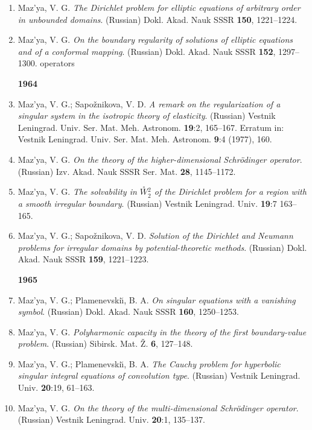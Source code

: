\documentclass{article}
\begin{document}
\begin{enumerate}
{\bf 1963}
\item Maz'ya, V. G. {\it The Dirichlet problem for elliptic equations
of
arbitrary order in unbounded domains}.
(Russian) Dokl. Akad. Nauk SSSR {\bf 150}, 1221--1224.
\item Maz'ya, V. G. {\it On the boundary regularity of solutions of
elliptic equations and of a conformal mapping}.
(Russian) Dokl. Akad. Nauk SSSR {\bf 152}, 1297--1300.
operators

{\bf 1964}
\item Maz'ya, V. G.; Sapo\v znikova, V. D. {\it A remark on the
regularization of a singular system in the isotropic
theory of elasticity}. (Russian) Vestnik Leningrad. Univ. Ser. Mat.
Meh.
Astronom. {\bf 19}:2, 165--167. Erratum in: Vestnik
Leningrad. Univ. Ser. Mat. Meh. Astronom. {\bf 9}:4 (1977), 160.
\item Maz'ya, V. G. {\it On the theory of the higher-dimensional
Schr\"odinger operator}.
(Russian) Izv. Akad. Nauk SSSR Ser. Mat. {\bf 28}, 1145--1172.
\item Maz'ya, V. G. {\it The solvability in $\stackrel{\circ}{W}
\!\!{}^2_2$ of the Dirichlet problem for a region with a smooth
irregular
boundary}. (Russian) Vestnik Leningrad. Univ. {\bf 19}:7 163--165.
\item Maz'ya, V. G.; Sapo\v znikova, V. D. {\it Solution of the
Dirichlet
and Neumann problems for irregular domains by potential-theoretic
methods}.
(Russian) Dokl. Akad. Nauk SSSR {\bf 159}, 1221--1223.\hfill\break

{\bf 1965}
\item Maz'ya, V. G.; Plamenevski{\u\i}, B. A. {\it On singular
equations
with a vanishing symbol}.
(Russian) Dokl. Akad. Nauk SSSR {\bf 160}, 1250--1253.
\item Maz'ya, V. G. {\it Polyharmonic capacity in the theory of the
first
boundary-value problem}.
(Russian) Sibirsk. Mat. \v Z. {\bf 6}, 127--148.
\item Maz'ya, V. G.; Plamenevski{\u\i}, B. A. {\it The Cauchy problem
for
hyperbolic singular integral equations
of convolution type}. (Russian) Vestnik Leningrad. Univ. {\bf 20}:19,
61--163.
\item Maz'ya, V. G. {\it On the theory of the multi-dimensional
Schr\"odinger operator}. (Russian) Vestnik Leningrad.
Univ. {\bf 20}:1, 135--137.\hfill\break


\end{enumerate}
\end{document}

